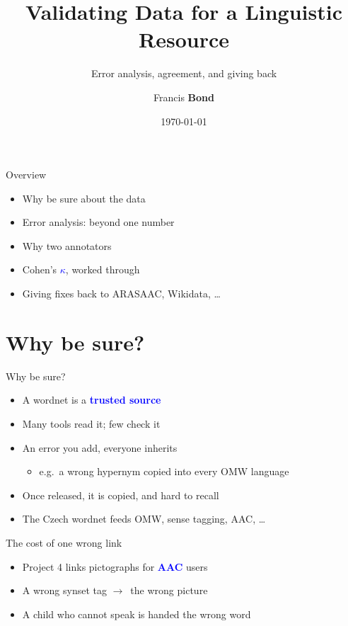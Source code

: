 \documentclass[xetex,aspectratio=169]{beamer}
\title[Validation]{Validating Data for a Linguistic Resource}
\subtitle{Error analysis, agreement, and giving back}
\author[Bond]{Francis \textbf{Bond}}
\institute[Palack\'y]{\href{https://bond-lab.github.io/}{Computational Linguistics Lab}
\\[1ex] Palack\'y University, Olomouc, Czechia
\\[1ex] JPC3 --- Improving the Czech Wordnet}
\date{\today}
\newcommand{\txx}[1]{\textbf{\textcolor{blue}{#1}}}
\newcommand{\into}{\ensuremath{\rightarrow}\xspace}
\begin{document}
\maketitle

\begin{frame}{Overview}
  \begin{itemize}
  \item Why be sure about the data
  \item Error analysis: beyond one number
  \item Why two annotators
  \item Cohen's \txx{$\kappa$}, worked through
  \item Giving fixes back to ARASAAC, Wikidata, \ldots
  \end{itemize}
\end{frame}

\section{Why be sure?}

\begin{frame}{Why be sure?}
  \begin{itemize}
  \item A wordnet is a \txx{trusted source}
  \item Many tools read it; few check it
  \item An error you add, everyone inherits
    \begin{itemize}
    \item e.g.\ a wrong hypernym copied into every OMW language
    \end{itemize}
  \item Once released, it is copied, and hard to recall
  \item The Czech wordnet feeds OMW, sense tagging, AAC, \ldots
  \end{itemize}
\end{frame}

\begin{frame}{The cost of one wrong link}
  \begin{itemize}
  \item Project 4 links pictographs for \txx{AAC} users
  \item A wrong synset tag \into\ the wrong picture
  \item A child who cannot speak is handed the wrong word
  \end{itemize}
\end{frame}
\end{document}
